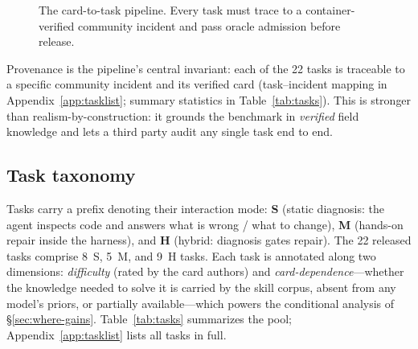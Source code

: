 \documentclass[11pt]{article}
\begin{document}
\begin{figure}[t]
\centering
{}
\caption{The card-to-task pipeline. Every task must trace to a container-verified community incident and pass oracle admission before release.}
\label{fig:pipeline}
\end{figure}

Provenance is the pipeline's central invariant: each of the 22 tasks is traceable to a specific community incident and its verified card (task--incident mapping in Appendix~\ref{app:tasklist}; summary statistics in Table~\ref{tab:tasks}).
This is stronger than realism-by-construction: it grounds the benchmark in \emph{verified} field knowledge and lets a third party audit any single task end to end.

\subsection{Task taxonomy}
\label{sec:taxonomy}

Tasks carry a prefix denoting their interaction mode: \textbf{S} (static diagnosis: the agent inspects code and answers what is wrong / what to change), \textbf{M} (hands-on repair inside the harness), and \textbf{H} (hybrid: diagnosis gates repair).
The 22 released tasks comprise 8~S, 5~M, and 9~H tasks.
Each task is annotated along two dimensions: \emph{difficulty} (rated by the card authors) and \emph{card-dependence}---whether the knowledge needed to solve it is carried by the skill corpus, absent from any model's priors, or partially available---which powers the conditional analysis of \S\ref{sec:where-gains}.
Table~\ref{tab:tasks} summarizes the pool; Appendix~\ref{app:tasklist} lists all tasks in full.

\begin{table}[t]
\centering
{}
\caption{Summary of the 22-task pool. Full task--incident mapping and per-task metadata are in Appendix~\ref{app:tasklist}.}
\label{tab:tasks}
\end{table}
\end{document}
